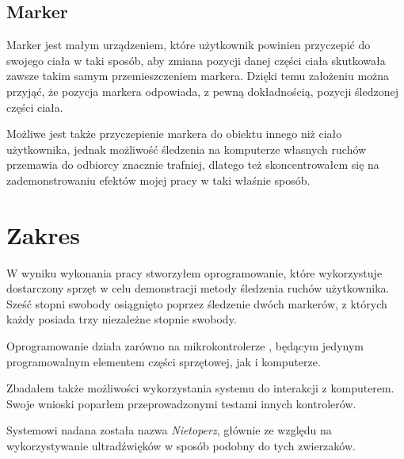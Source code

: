 \subsection{Marker}
Marker jest małym urządzeniem, które użytkownik powinien przyczepić do swojego ciała w taki sposób, aby zmiana pozycji danej części ciała skutkowała zawsze takim samym przemieszczeniem markera. Dzięki temu założeniu można przyjąć, że pozycja markera odpowiada, z pewną dokładnością, pozycji śledzonej części ciała.

Możliwe jest także przyczepienie markera do obiektu innego niż ciało użytkownika, jednak możliwość śledzenia na komputerze własnych ruchów przemawia do odbiorcy znacznie trafniej, dlatego też skoncentrowałem się na zademonstrowaniu efektów mojej pracy w taki właśnie sposób.

\section{Zakres}
W wyniku wykonania pracy stworzyłem oprogramowanie, które wykorzystuje dostarczony sprzęt w celu demonstracji metody śledzenia ruchów użytkownika. Sześć stopni swobody osiągnięto poprzez śledzenie dwóch markerów, z których każdy posiada trzy niezależne stopnie swobody.

Oprogramowanie działa zarówno na mikrokontrolerze , będącym jedynym programowalnym elementem części sprzętowej, jak i komputerze.

Zbadałem także możliwości wykorzystania systemu do interakcji z komputerem. Swoje wnioski poparłem przeprowadzonymi testami innych kontrolerów.

Systemowi nadana została nazwa \textsl{Nietoperz}, głównie ze względu na wykorzystywanie ultradźwięków w sposób podobny do tych zwierzaków.

